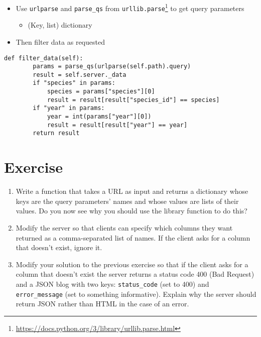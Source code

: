 \documentclass[krantzl]{krantz}
\newcommand{\hreffoot}[2]{{#1}\footnote{\href{#2}{#2}}}
\begin{document}
\begin{itemize}
\item Use \texttt{urlparse} and \texttt{parse\_qs} from \hreffoot{\texttt{urllib.parse}}{https://docs.python.org/3/library/urllib.parse.html} to get query parameters\begin{itemize}
\item (Key, list) dictionary

\end{itemize}


\item Then filter data as requested

\end{itemize}
\begin{lstlisting}[frame=tblr]
    def filter_data(self):
        params = parse_qs(urlparse(self.path).query)
        result = self.server._data
        if "species" in params:
            species = params["species"][0]
            result = result[result["species_id"] == species]
        if "year" in params:
            year = int(params["year"][0])
            result = result[result["year"] == year]
        return result
\end{lstlisting}

\section{Exercise}
\begin{enumerate}
\item 

Write a function that takes a URL as input
    and returns a dictionary whose keys are the query parameters’ names
    and whose values are lists of their values.
    Do you now see why you should use the library function to do this?



\item 

Modify the server so that clients can specify which columns they want returned
    as a comma-separated list of names.
    If the client asks for a column that doesn’t exist, ignore it.



\item 

Modify your solution to the previous exercise so that
    if the client asks for a column that doesn’t exist
    the server returns a status code 400 (Bad Request)
    and a JSON blog with two keys:
    \texttt{status\_code} (set to 400)
    and \texttt{error\_message} (set to something informative).
    Explain why the server should return JSON rather than HTML in the case of an error.



\end{enumerate}
\end{document}
